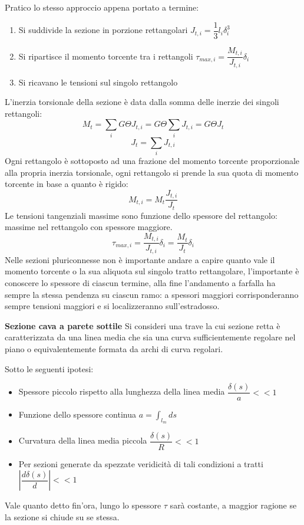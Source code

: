 \documentclass{article}
\begin{document}
\begin{adjustwidth}{2in}{}
		Pratico lo stesso approccio appena portato a termine:
		\begin{enumerate}
			\item Si suddivide la sezione in porzione rettangolari \( J_{t,i} = \dfrac{1}{3}l_i\delta^3_i \)
			\item Si ripartisce il momento torcente tra i rettangoli \( \tau_{max,i} = \dfrac{M_{t,i}}{J_{t,i}}\delta_i\)
			\item Si ricavano le tensioni sul singolo rettangolo
		\end{enumerate}
		L’inerzia torsionale della sezione è data dalla somma delle inerzie dei
		singoli rettangoli:
		\[ M_t = \sum_i G\Theta J_{t,i} = G\Theta \sum_i J_{t,i} = G\Theta J_t\]
		\[ J_t = \sum_i J_{t,i} \]
		Ogni rettangolo è sottoposto ad una frazione del momento torcente
		proporzionale alla propria inerzia torsionale, ogni rettangolo si prende la sua quota di momento torcente in base a quanto è rigido:
		\[ M_{t,i} = M_t\dfrac{J_{t,i}}{J_{t}} \]
		Le tensioni tangenziali massime sono funzione dello spessore del
		rettangolo: massime nel rettangolo con spessore maggiore.
		\[ \tau_{max,i} = \dfrac{M_{t,i}}{J_{t,i}}\delta_i = \dfrac{M_t}{J_t}\delta_i \]
		Nelle sezioni pluriconnesse non è importante andare a capire quanto vale il momento torcente o la sua aliquota sul singolo tratto rettangolare, l'importante è conoscere lo spessore di ciascun termine, alla fine l'andamento a farfalla ha sempre la stessa pendenza su ciascun ramo: a spessori maggiori corrisponderanno sempre tensioni maggiori e si localizzeranno sull'estradosso. 	\newline 
			
		\textbf{{\Large Sezione cava a parete sottile}}\newline
		Si consideri una trave la cui sezione retta è caratterizzata da una linea media che sia una curva sufficientemente
		regolare nel piano o equivalentemente formata da archi di curva regolari. 
		
		Sotto le seguenti ipotesi:
		\begin{itemize}
			\item Spessore piccolo rispetto alla lunghezza della linea media \(\dfrac{\delta(s)}{a}<<1\)
			\item Funzione dello spessore continua \( a = \int_{l_m}ds\)
			\item Curvatura della linea media  piccola \(\dfrac{\delta(s)}{R}<<1\)
			\item Per sezioni generate da spezzate veridicità di tali condizioni a tratti \newline \( \left|\dfrac{d\delta(s)}{d}\right|<<1 \)
		\end{itemize}
		Vale quanto detto fin'ora, lungo lo spessore $\tau$ sarà costante, a maggior ragione se la sezione si chiude su se stessa.
		

\end{adjustwidth}
\end{document}
